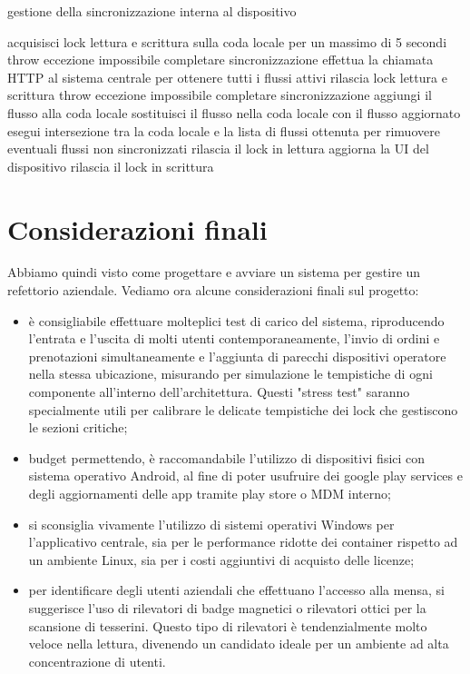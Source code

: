 \documentclass[a4paper, titlepage, 12pt, openright, twoside]{book}
\begin{document}
\begin{algorithm}
\caption{gestione della sincronizzazione interna al dispositivo}
\begin{algorithmic}[1]
\State acquisisci lock lettura e scrittura sulla coda locale per un massimo di 5 secondi
\State throw eccezione impossibile completare sincronizzazione
\EndIf
\State effettua la chiamata HTTP al sistema centrale per ottenere tutti i flussi attivi
	\State rilascia lock lettura e scrittura
	\State throw eccezione impossibile completare sincronizzazione
\EndIf
{}
		\State aggiungi il flusso alla coda locale
		\State sostituisci il flusso nella coda locale con il flusso aggiornato
	\EndIf
\EndFor
\State esegui intersezione tra la coda locale e la lista di flussi ottenuta per rimuovere eventuali flussi non sincronizzati
\State rilascia il lock in lettura
\State aggiorna la UI del dispositivo
\State rilascia il lock in scrittura
\end{algorithmic}
\end{algorithm}

\section{Considerazioni finali}

Abbiamo quindi visto come progettare e avviare un sistema per gestire un refettorio aziendale. Vediamo ora alcune considerazioni finali sul progetto:

\begin{itemize}
\item è consigliabile effettuare molteplici test di carico del sistema, riproducendo l'entrata e l'uscita di molti utenti contemporaneamente, l'invio di ordini e prenotazioni simultaneamente e l'aggiunta di parecchi dispositivi operatore nella stessa ubicazione, misurando per simulazione le tempistiche di ogni componente all'interno dell'architettura. Questi "stress test" saranno specialmente utili per calibrare le delicate tempistiche dei lock che gestiscono le sezioni critiche;
\item budget permettendo, è raccomandabile l'utilizzo di dispositivi fisici con sistema operativo Android, al fine di poter usufruire dei google play services e degli aggiornamenti delle app tramite play store o MDM interno;
\item si sconsiglia vivamente l'utilizzo di sistemi operativi Windows per l'applicativo centrale, sia per le performance ridotte dei container rispetto ad un ambiente Linux, sia per i costi aggiuntivi di acquisto delle licenze;
\item per identificare degli utenti aziendali che effettuano l'accesso alla mensa, si suggerisce l'uso di rilevatori di badge magnetici o rilevatori ottici per la scansione di tesserini. Questo tipo di rilevatori è tendenzialmente molto veloce nella lettura, divenendo un candidato ideale per un ambiente ad alta concentrazione di utenti.

\end{itemize}
\end{document}
